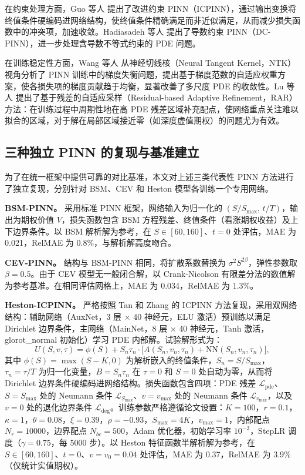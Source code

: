 在约束处理方面，Guo 等人\citep{guo2024icpinn} 提出了改进约束 PINN（ICPINN），通过输出变换将终值条件硬编码进网络结构，使终值条件精确满足而非近似满足，从而减少损失函数中的冲突项，加速收敛。Hadiasadeh 等人\citep{dcpinns2024} 提出了导数约束 PINN（DC-PINN），进一步处理含导数不等式约束的 PDE 问题。

在训练稳定性方面，Wang 等人\citep{wang2022ntk} 从神经切线核（Neural Tangent Kernel，NTK）视角分析了 PINN 训练中的梯度失衡问题，提出基于梯度范数的自适应权重方案，使各损失项的梯度贡献趋于均衡，显著改善了多尺度 PDE 的收敛性。Lu 等人\citep{lu2021deepxde} 提出了基于残差的自适应采样（Residual-based Adaptive Refinement，RAR）方法：在训练过程中周期性地在高 PDE 残差区域补充配点，使网络重点关注难以拟合的区域，对于解在局部区域接近零（如深度虚值期权）的问题尤为有效。

\subsection{三种独立 PINN 的复现与基准建立}\label{subsec:reproduction}

为了在统一框架中提供可靠的对比基准，本文对上述三类代表性 PINN 方法进行了独立复现，分别针对 BSM、CEV 和 Heston 模型各训练一个专用网络。

\textbf{BSM-PINN。} 采用标准 PINN 框架，网络输入为归一化的 $(S/S_{\max},\,t/T)$，输出为期权价值 $V$，损失函数包含 BSM 方程残差、终值条件（看涨期权收益）及上下边界条件。以 BSM 解析解为参考，在 $S\in[60,160]$、$t=0$ 处评估，MAE 为 0.021，RelMAE 为 0.8\%，与解析解高度吻合。

\textbf{CEV-PINN。} 结构与 BSM-PINN 相同，将扩散系数替换为 $\sigma^2 S^{2\beta}$，弹性参数取 $\beta=0.5$。由于 CEV 模型无一般闭合解，以 Crank-Nicolson 有限差分法的数值解为参考基准。在相同评估网格上，MAE 为 0.034，RelMAE 为 1.3\%。

\textbf{Heston-ICPINN。} 严格按照 Tan 和 Zhang\citep{guo2024icpinn} 的 ICPINN 方法复现，采用双网络结构：辅助网络（AuxNet，3 层 $\times$ 40 神经元，ELU 激活）预训练以满足 Dirichlet 边界条件，主网络（MainNet，8 层 $\times$ 40 神经元，Tanh 激活，glorot\_normal 初始化）学习 PDE 内部解。试验解形式为：
\begin{equation}\label{eq:icpinn_trial}
  U(S,v,\tau) = \phi(S) + S_n\tau_n \cdot \bigl[A(S_n,v_n,\tau_n) + \mathrm{NN}(S_n,v_n,\tau_n)\bigr],
\end{equation}
其中 $\phi(S)=\max(S-K,0)$ 为解析嵌入的终值条件，$S_n=S/S_{\max}$，$\tau_n=\tau/T$ 为归一化变量，$B=S_n\tau_n$ 在 $\tau=0$ 和 $S=0$ 处自动为零，从而将 Dirichlet 边界条件硬编码进网络结构。损失函数包含四项：PDE 残差 $\mathcal{L}_{\text{pde}}$、$S=S_{\max}$ 处的 Neumann 条件 $\mathcal{L}_{S_{\max}}$、$v=v_{\max}$ 处的 Neumann 条件 $\mathcal{L}_{v_{\max}}$，以及 $v=0$ 处的退化边界条件 $\mathcal{L}_{\text{deg}}$。训练参数严格遵循论文设置：$K=100$，$r=0.1$，$\kappa=1$，$\theta=0.08$，$\xi=0.39$，$\rho=-0.93$，$S_{\max}=4K$，$v_{\max}=1$，内部配点 $N_r=10000$，边界配点 $N_{bc}=500$，Adam 优化器，初始学习率 $10^{-3}$，StepLR 调度（$\gamma=0.75$，每 5000 步）。以 Heston 特征函数半解析解为参考，在 $S\in[60,160]$、$t=0$、$v=v_0=0.04$ 处评估，MAE 为 0.37，RelMAE 为 3.9\%（仅统计实值期权）。

